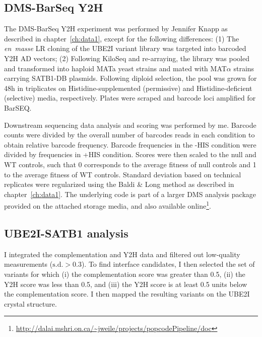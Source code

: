 \subsection{DMS-BarSeq Y2H}
The DMS-BarSeq Y2H experiment was performed by Jennifer Knapp as described in chapter~\ref{ch:data1}, except for the following differences: (1) The \textit{en~masse} LR cloning of the UBE2I variant library was targeted into barcoded Y2H AD vectors; (2) Following KiloSeq and re-arraying, the library was pooled and transformed into haploid MATa yeast strains and mated with MAT$\alpha$ strains carrying SATB1-DB plasmids. Following diploid selection, the pool was grown for 48h in triplicates on Histidine-supplemented (permissive) and Histidine-deficient (selective) media, respectively. Plates were scraped and barcode loci amplified for BarSEQ.

Downstream sequencing data analysis and scoring was performed by me. Barcode counts were divided by the overall number of barcodes reads in each condition to obtain relative barcode frequency. Barcode frequencies in the -HIS condition were divided by frequencies in +HIS condition. Scores were then scaled to the null and WT controls, such that 0 corresponds to the average fitness of null controls and 1 to the average fitness of WT controls. Standard deviation based on technical replicates were regularized using the Baldi \& Long method as described in chapter~\ref{ch:data1}. The underlying code is part of a larger DMS analysis package provided on the attached storage media, and also available online\footnote{\url{http://dalai.mshri.on.ca/~jweile/projects/popcodePipeline/doc}}.

\subsection{UBE2I-SATB1 analysis}
I integrated the complementation and Y2H data and filtered out low-quality measurements ($\text{s.d.} > 0.3$). To find interface candidates, I then selected the set of variants for which (i) the complementation score was greater than 0.5, (ii) the Y2H score was less than 0.5, and (iii) the Y2H score is at least 0.5 units below the complementation score. I then mapped the resulting variants on the UBE2I crystal structure.

